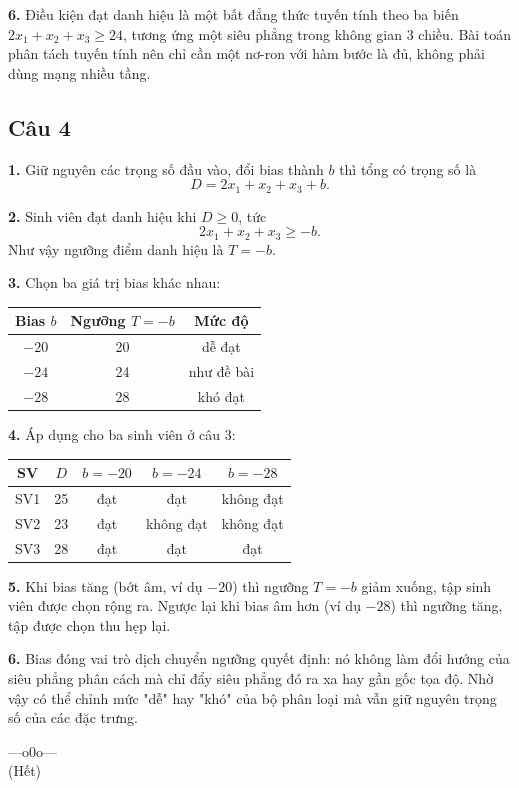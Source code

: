 \documentclass[a4paper,12pt]{article}
\begin{document}
\textbf{6.} Điều kiện đạt danh hiệu là một bất đẳng thức tuyến tính theo ba biến
$2x_1 + x_2 + x_3 \ge 24$, tương ứng một siêu phẳng trong không gian 3 chiều. Bài toán phân
tách tuyến tính nên chỉ cần một nơ-ron với hàm bước là đủ, không phải dùng mạng nhiều tầng.

\subsection*{Câu 4}

\textbf{1.} Giữ nguyên các trọng số đầu vào, đổi bias thành $b$ thì tổng có trọng số là
\[ D = 2x_1 + x_2 + x_3 + b. \]

\textbf{2.} Sinh viên đạt danh hiệu khi $D \ge 0$, tức
\[ 2x_1 + x_2 + x_3 \ge -b. \]
Như vậy ngưỡng điểm danh hiệu là $T = -b$.

\textbf{3.} Chọn ba giá trị bias khác nhau:
\begin{center}
\begin{tabular}{|c|c|c|}
\hline
Bias $b$ & Ngưỡng $T = -b$ & Mức độ \\
\hline
$-20$ & 20 & dễ đạt \\
$-24$ & 24 & như đề bài \\
$-28$ & 28 & khó đạt \\
\hline
\end{tabular}
\end{center}

\textbf{4.} Áp dụng cho ba sinh viên ở câu 3:
\begin{center}
\begin{tabular}{|c|c|c|c|c|}
\hline
SV & $D$ & $b=-20$ & $b=-24$ & $b=-28$ \\
\hline
SV1 & 25 & đạt & đạt & không đạt \\
SV2 & 23 & đạt & không đạt & không đạt \\
SV3 & 28 & đạt & đạt & đạt \\
\hline
\end{tabular}
\end{center}

\textbf{5.} Khi bias tăng (bớt âm, ví dụ $-20$) thì ngưỡng $T = -b$ giảm xuống, tập sinh viên
được chọn rộng ra. Ngược lại khi bias âm hơn (ví dụ $-28$) thì ngưỡng tăng, tập được chọn
thu hẹp lại.

\textbf{6.} Bias đóng vai trò dịch chuyển ngưỡng quyết định: nó không làm đổi hướng của siêu
phẳng phân cách mà chỉ đẩy siêu phẳng đó ra xa hay gần gốc tọa độ. Nhờ vậy có thể chỉnh mức
"dễ" hay "khó" của bộ phân loại mà vẫn giữ nguyên trọng số của các đặc trưng.

\begin{center}
---o0o--- \\[0.3cm]
(Hết)
\end{center}
\end{document}
